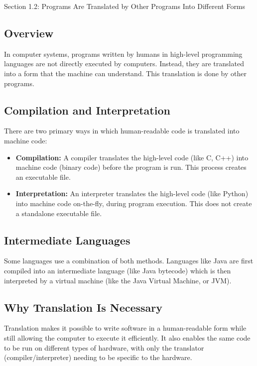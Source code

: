 \begin{notes}{Section 1.2: Programs Are Translated by Other Programs Into Different Forms}
    \subsection*{Overview}

    In computer systems, programs written by humans in high-level programming languages are not directly executed by computers. Instead, they are translated into a form that the machine can understand. 
    This translation is done by other programs. \vspace*{1em}
    
    \subsection*{Compilation and Interpretation}

    There are two primary ways in which human-readable code is translated into machine code:

    \begin{itemize}
        \item \textbf{Compilation:} A compiler translates the high-level code (like C, C++) into machine code (binary code) before the program is run. This process creates an executable file.
        \item \textbf{Interpretation:} An interpreter translates the high-level code (like Python) into machine code on-the-fly, during program execution. This does not create a standalone executable 
        file.
    \end{itemize}
    
    \subsection*{Intermediate Languages}

    Some languages use a combination of both methods. Languages like Java are first compiled into an intermediate language (like Java bytecode) which is then interpreted by a virtual machine (like the 
    Java Virtual Machine, or JVM).
    
    \subsection*{Why Translation Is Necessary}

    Translation makes it possible to write software in a human-readable form while still allowing the computer to execute it efficiently. It also enables the same code to be run on different types 
    of hardware, with only the translator (compiler/interpreter) needing to be specific to the hardware.
    

\end{notes}

